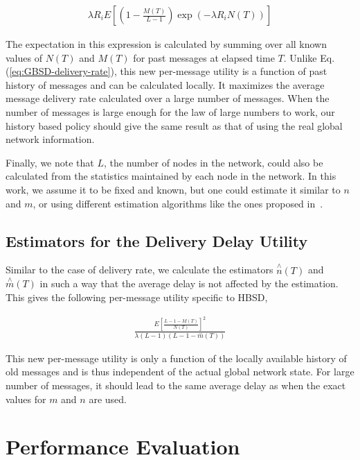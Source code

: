 \begin{align}
\label{HBSD-DR-U}
\lambda R_i E[(1-\frac{M(T)}{L-1})\exp( - \lambda R_i N(T))]
\end{align}

The expectation in this expression is calculated by summing over all known values of $N(T)$ and $M(T)$ for past messages at elapsed time $T$. Unlike Eq.(\ref{eq:GBSD-delivery-rate}), this new per-message utility is a function of past history of messages and can be calculated locally. It maximizes the average message delivery rate calculated over a large number of messages. When the number of messages is large enough for the law of large numbers to work, our history based policy should give the same result as that of using the real global network information.

Finally, we note that $L$, the number of nodes in the network, could also be calculated from the statistics maintained by each node in the network. In this work, we assume it to be fixed and known, but one could estimate it similar to $n$ and $m$, or using different estimation algorithms like the ones proposed in~\cite{PellegriniAOC2009}.

\subsection{Estimators for the Delivery Delay Utility}
\label{sec:learning:EDD}

Similar to the case of delivery rate, we calculate the estimators $\stackrel{\wedge}{n}(T)$ and $\stackrel{\wedge}{m}(T)$ in such a way that the average delay is not affected by the estimation. This gives the following per-message utility specific to HBSD,

\begin{align}
\label{HBSD-DD-U}
\frac{E[\frac{L-1-M(T)}{N(T)}]^2}{\lambda
(L-1)(L-1-\stackrel{-}{m}(T))}
\end{align}

This new per-message utility is only a function of the locally available history of old messages and is thus
independent of the actual global network state. For large number of messages, it should lead to the same average delay
as when the exact values for $m$ and $n$ are used.


\section{Performance Evaluation}
\label{sec:sims}

